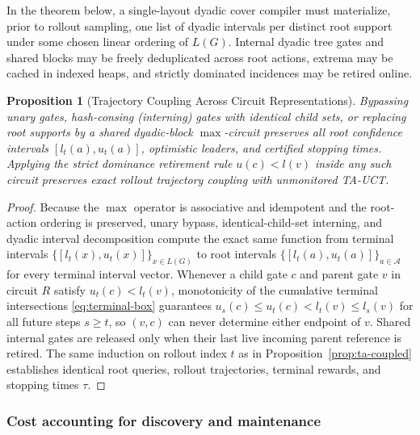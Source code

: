 \documentclass{article}
\theoremstyle{plain}
\newtheorem{proposition}[theorem]{Proposition}
\theoremstyle{definition}
\begin{document}
In the theorem below, a single-layout dyadic cover compiler must materialize, prior to rollout sampling, one list of dyadic intervals per distinct root support under some chosen linear ordering of $L(G)$. Internal dyadic tree gates and shared blocks may be freely deduplicated across root actions, extrema may be cached in indexed heaps, and strictly dominated incidences may be retired online.

\begin{proposition}[Trajectory Coupling Across Circuit Representations]
\label{prop:representation-coupling}
Bypassing unary gates, hash-consing (interning) gates with identical child sets, or replacing root supports by a shared dyadic-block $\max$-circuit preserves all root confidence intervals $[l_t(a), u_t(a)]$, optimistic leaders, and certified stopping times. Applying the strict dominance retirement rule $u(c) < l(v)$ inside any such circuit preserves exact rollout trajectory coupling with unmonitored TA-UCT.
\end{proposition}

\begin{proof}
Because the $\max$ operator is associative and idempotent and the root-action ordering is preserved, unary bypass, identical-child-set interning, and dyadic interval decomposition compute the exact same function from terminal intervals $\{[l_t(x), u_t(x)]\}_{x \in L(G)}$ to root intervals $\{[l_t(a), u_t(a)]\}_{a \in \mathcal{A}}$ for every terminal interval vector. Whenever a child gate $c$ and parent gate $v$ in circuit $R$ satisfy $u_t(c) < l_t(v)$, monotonicity of the cumulative terminal intersections \eqref{eq:terminal-box} guarantees $u_s(c) \le u_t(c) < l_t(v) \le l_s(v)$ for all future steps $s \ge t$, so $(v,c)$ can never determine either endpoint of $v$. Shared internal gates are released only when their last live incoming parent reference is retired. The same induction on rollout index $t$ as in Proposition~\ref{prop:ta-coupled} establishes identical root queries, rollout trajectories, terminal rewards, and stopping times $\tau$.
\end{proof}

\subsubsection{Cost accounting for discovery and maintenance}
\end{document}
